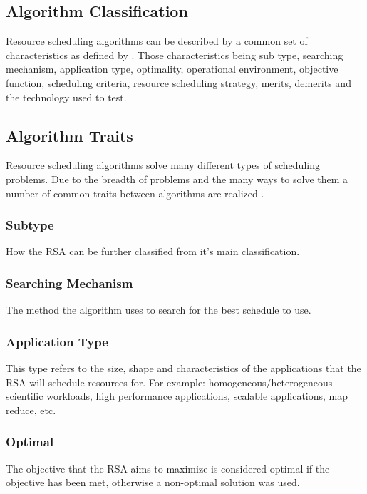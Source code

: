 \documentclass[fullapage,12pt]{article}
\begin{document}
\subsection{Algorithm Classification} \label{sub:algclassification}


Resource scheduling algorithms can be described by a common set of characteristics as defined by \textcite{Singh2016}. Those characteristics being sub type, searching mechanism, application type, optimality, operational environment, objective function, scheduling criteria, resource scheduling strategy, merits, demerits and the technology used to test.

\subsection{Algorithm Traits} \label{sub:algtraits}

Resource scheduling algorithms solve many different types of scheduling problems. Due to the breadth of problems and the many ways to solve them a number of common traits between algorithms are realized \cite{Singh2016}.

\subsubsection*{Subtype} How the RSA can be further classified from it's main classification.

\subsubsection*{Searching Mechanism} The method the algorithm uses to search for the best schedule to use.

\subsubsection*{Application Type} This type refers to the size, shape and characteristics of the applications that the RSA will schedule resources for. For example: homogeneous/heterogeneous scientific workloads, high performance applications, scalable applications, map reduce, etc.

\subsubsection*{Optimal} The objective that the RSA aims to maximize is considered optimal if the objective has been met, otherwise a non-optimal solution was used.
\end{document}
